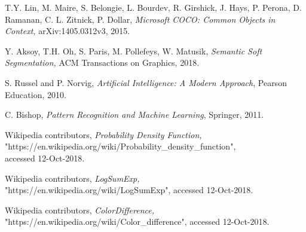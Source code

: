 \documentclass[conference]{IEEEtran}
\begin{document}
\begin{thebibliography}{1}
 T.Y. Lin, M. Maire, S. Belongie, L. Bourdev, R. Girshick, J. Hays, P. Perona, D. Ramanan, C. L. Zitnick, P. Dollar, \emph{Microsoft COCO: Common Objects in Context,} arXiv:1405.0312v3, 2015.

 Y. Aksoy, T.H. Oh, S. Paris, M. Pollefeys, W. Matusik, \emph{Semantic Soft Segmentation,} ACM Transactions on Graphics, 2018.

 S. Russel and P. Norvig, \emph{Artificial Intelligence: A Modern Approach}, Pearson Education, 2010.

 C. Bishop, \emph{Pattern Recognition and Machine Learning}, Springer, 2011.

 Wikipedia contributors, \emph{Probability Density Function,} \\"https://en.wikipedia.org/wiki/Probability\_density\_function",\\accessed 12-Oct-2018.

 Wikipedia contributors, \emph{LogSumExp,}\\"https://en.wikipedia.org/wiki/LogSumExp", accessed 12-Oct-2018.

 Wikipedia contributors, \emph{ColorDifference,}\\"https://en.wikipedia.org/wiki/Color\_difference", accessed 12-Oct-2018.
\end{thebibliography} 
\end{document}
